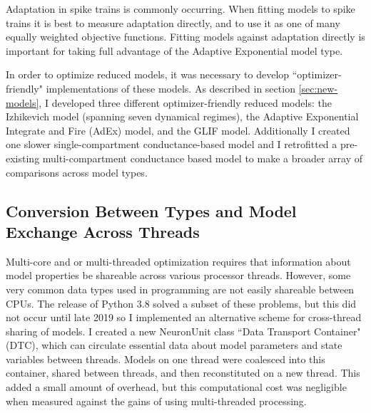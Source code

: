 Adaptation in spike trains is commonly occurring. When fitting models to spike trains it is best to measure adaptation directly, and to use it as one of many equally weighted objective functions. Fitting models against adaptation directly is important for taking full advantage of the Adaptive Exponential model type.


  

In order to optimize reduced models, it was necessary to develop ``optimizer-friendly" implementations of these models.
As described in section \ref{sec:new-models}, I developed three different optimizer-friendly reduced models: the Izhikevich model (spanning seven dynamical regimes), the Adaptive Exponential Integrate and Fire (AdEx) model, and the GLIF model.
Additionally I created one slower single-compartment conductance-based model and I retrofitted a pre-existing multi-compartment conductance based model to make a broader array of comparisons across model types.

\subsection{Conversion Between Types and Model Exchange Across Threads}
Multi-core and or multi-threaded optimization requires that information about model properties be shareable across various processor threads.
However, some very common data types used in programming are not easily shareable between CPUs.
The release of Python 3.8 solved a subset of these problems, but this did not occur until late 2019 so I implemented an alternative scheme for cross-thread sharing of models.
I created a new NeuronUnit class ``Data Transport Container" (DTC), which can circulate essential data about model parameters and state variables between threads.
Models on one thread were coalesced into this container, shared between threads, and then reconstituted on a new thread.
This added a small amount of overhead, but this computational cost was negligible when measured against the gains of using multi-threaded processing.

